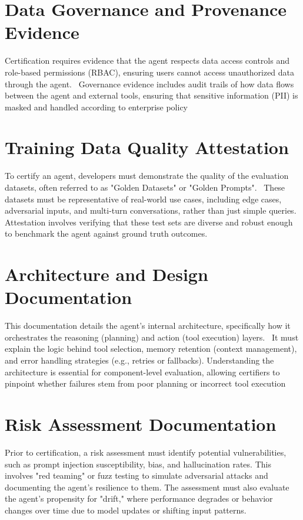 \begin{TNtwocol}
\section{Data Governance and Provenance Evidence}
Certification requires evidence that the agent respects data access controls and role-based permissions (RBAC), ensuring users cannot access unauthorized data through the agent.~\cite{Mohammadi_2025} Governance evidence includes audit trails of how data flows between the agent and external tools, ensuring that sensitive information (PII) is masked and handled according to enterprise policy
\section{Training Data Quality Attestation}
To certify an agent, developers must demonstrate the quality of the evaluation datasets, often referred to as "Golden Datasets" or "Golden Prompts".~\cite{deepeval_ai_agent_evaluation} These datasets must be representative of real-world use cases, including edge cases, adversarial inputs, and multi-turn conversations, rather than just simple queries. Attestation involves verifying that these test sets are diverse and robust enough to benchmark the agent against ground truth outcomes.~\cite{deepeval_ai_agent_evaluation}
\section{Architecture and Design Documentation}
This documentation details the agent's internal architecture, specifically how it orchestrates the reasoning (planning) and action (tool execution) layers.~\cite{deepeval_ai_agent_evaluation} It must explain the logic behind tool selection, memory retention (context management), and error handling strategies (e.g., retries or fallbacks). Understanding the architecture is essential for component-level evaluation, allowing certifiers to pinpoint whether failures stem from poor planning or incorrect tool execution
\section{Risk Assessment Documentation}
Prior to certification, a risk assessment must identify potential vulnerabilities, such as prompt injection susceptibility, bias, and hallucination rates. This involves "red teaming" or fuzz testing to simulate adversarial attacks and documenting the agent's resilience to them. The assessment must also evaluate the agent's propensity for "drift," where performance degrades or behavior changes over time due to model updates or shifting input patterns.

\end{TNtwocol}
